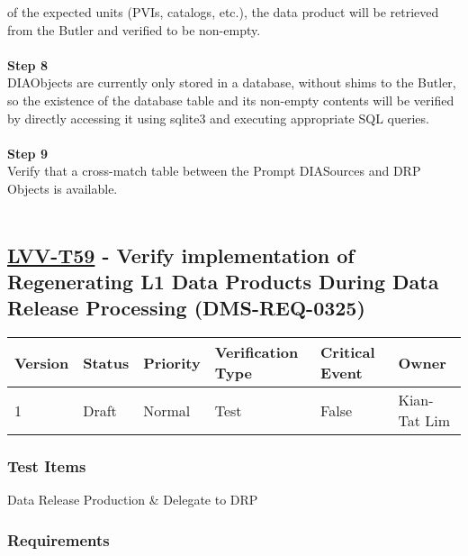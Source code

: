 of the expected units (PVIs, catalogs, etc.), the data product will be
retrieved from the Butler and verified to be non-empty.\\
~\\
\textbf{Step 8}\\
DIAObjects are currently only stored in a database, without shims to the
Butler, so the existence of the database table and its non-empty
contents will be verified by directly accessing it using sqlite3 and
executing appropriate SQL queries.\\
~\\
\textbf{Step 9}\\
Verify that a cross-match table between the Prompt DIASources and DRP
Objects is available.\\
~\\

\hypertarget{lvv-t59---verify-implementation-of-regenerating-l1-data-products-during-data-release-processing-dms-req-0325}{%
\subsection{\texorpdfstring{\href{https://jira.lsstcorp.org/secure/Tests.jspa\#/testCase/LVV-T59}{LVV-T59}
- Verify implementation of Regenerating L1 Data Products During Data
Release Processing
(DMS-REQ-0325)}{LVV-T59 - Verify implementation of Regenerating L1 Data Products During Data Release Processing (DMS-REQ-0325)}}\label{lvv-t59---verify-implementation-of-regenerating-l1-data-products-during-data-release-processing-dms-req-0325}}

\begin{longtable}[]{@{}llllll@{}}
\toprule
Version & Status & Priority & Verification Type & Critical Event &
Owner\tabularnewline
\midrule
\endhead
1 & Draft & Normal & Test & False & Kian-Tat Lim\tabularnewline
\bottomrule
\end{longtable}

\hypertarget{test-items-35}{%
\subsubsection{Test Items}\label{test-items-35}}

Data Release Production \& Delegate to DRP

\hypertarget{requirements-36}{%
\subsubsection{Requirements}\label{requirements-36}}

